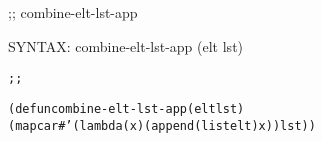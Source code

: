 \begin{aibox}{\function}
;; combine-elt-lst-app

SYNTAX: combine-elt-lst-app (elt lst)
\end{aibox}

\begin{aibox}{\examples}
\begin{alltt}
\end{alltt}

\end{aibox}

\begin{aibox}{\comments}

\end{aibox}
\begin{aibox}{\answers}

\end{aibox}
\begin{aibox}{\othercomments}

\end{aibox}
\begin{aibox}{\pseudocode}

\end{aibox}
\begin{aibox}{\code}

\begin{alltt}
;;%% code

(defun combine-elt-lst-app (elt lst)
            (mapcar #'(lambda (x) (append (list elt) x)) lst))

\end{alltt}
\end{aibox}
